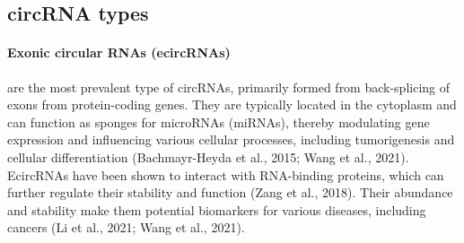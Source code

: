 \subsection{circRNA types}

\paragraph{Exonic circular RNAs (ecircRNAs)} are the most prevalent type of
circRNAs, primarily formed from back-splicing of exons from protein-coding
genes.
They are typically located in the cytoplasm and can function as sponges for
microRNAs (miRNAs), thereby modulating gene expression and influencing various
cellular processes, including tumorigenesis and cellular differentiation
(Bachmayr-Heyda et al., 2015; Wang et al., 2021).
EcircRNAs have been shown to interact with RNA-binding proteins, which can
further regulate their stability and function (Zang et al., 2018).
Their abundance and stability make them potential biomarkers for various
diseases, including cancers (Li et al., 2021; Wang et al., 2021).


